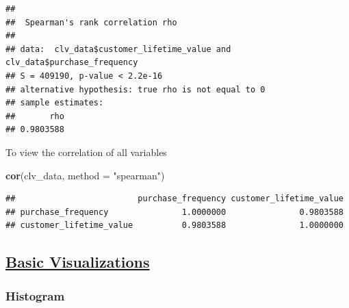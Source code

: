 \documentclass[
]{article}
\newenvironment{Shaded}{\begin{snugshade}}{\end{snugshade}}
\newcommand{\AttributeTok}[1]{\textcolor[rgb]{0.13,0.29,0.53}{#1}}
\newcommand{\FunctionTok}[1]{\textcolor[rgb]{0.13,0.29,0.53}{\textbf{#1}}}
\newcommand{\NormalTok}[1]{#1}
\newcommand{\SpecialCharTok}[1]{\textcolor[rgb]{0.81,0.36,0.00}{\textbf{#1}}}
\newcommand{\StringTok}[1]{\textcolor[rgb]{0.31,0.60,0.02}{#1}}
\begin{document}
\begin{Shaded}
\end{Shaded}

\begin{verbatim}
## 
##  Spearman's rank correlation rho
## 
## data:  clv_data$customer_lifetime_value and clv_data$purchase_frequency
## S = 409190, p-value < 2.2e-16
## alternative hypothesis: true rho is not equal to 0
## sample estimates:
##       rho 
## 0.9803588
\end{verbatim}

To view the correlation of all variables

\begin{Shaded}
\begin{Highlighting}[]
\FunctionTok{cor}\NormalTok{(clv\_data, }\AttributeTok{method =} \StringTok{"spearman"}\NormalTok{)}
\end{Highlighting}
\end{Shaded}

\begin{verbatim}
##                         purchase_frequency customer_lifetime_value
## purchase_frequency               1.0000000               0.9803588
## customer_lifetime_value          0.9803588               1.0000000
\end{verbatim}

\subsection{\texorpdfstring{\ul{\textbf{Basic
Visualizations}}}{Basic Visualizations}}\label{basic-visualizations}

\subsubsection{\texorpdfstring{\textbf{Histogram}}{Histogram}}\label{histogram}
\end{document}
